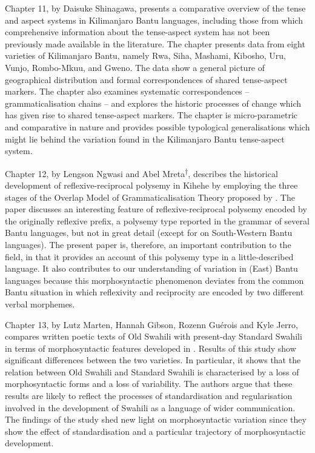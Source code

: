 \documentclass[output=paper]{langscibook}
\begin{document}
Chapter 11, by Daisuke Shinagawa, presents a comparative overview of the tense and aspect systems in Kilimanjaro Bantu languages, including those from which comprehensive information about the tense-aspect system has not been previously made available in the literature. The chapter presents data from eight varieties of Kilimanjaro Bantu, namely Rwa, Siha, Mashami, Kibosho, Uru, Vunjo, Rombo-Mkuu, and Gweno. The data show a general picture of geographical distribution and formal correspondences of shared tense-aspect markers. The chapter also examines systematic correspondences – grammaticalisation chains – and explores the historic processes of change which has given rise to shared tense-aspect markers. The chapter is micro-parametric and comparative in nature and provides possible typological generalisations which might lie behind the variation found in the Kilimanjaro Bantu tense-aspect system.

Chapter 12, by Lengson Ngwasi and Abel Mreta\textsuperscript{†}, describes the historical development of reflexive-reciprocal polysemy in Kihehe by employing the three stages of the Overlap Model of Grammaticalisation Theory proposed by \citet{Heine1993}. The paper discusses an interesting feature of reflexive-reciprocal polysemy encoded by the originally reflexive prefix, a polysemy type reported in the grammar of several Bantu languages, but not in great detail (except for \citealt{BostoenForthcoming} on South-Western Bantu languages). The present paper is, therefore, an important contribution to the field, in that it provides an account of this polysemy type in a little-described language. It also contributes to our understanding of variation in (East) Bantu languages because this morphosyntactic phenomenon deviates from the common Bantu situation in which reflexivity and reciprocity are encoded by two different verbal morphemes.

Chapter 13, by Lutz Marten, Hannah Gibson, Rozenn Guérois and Kyle Jerro, compares written poetic texts of Old Swahili with present-day Standard Swahili in terms of morphosyntactic features developed in \citet{GuéroisEtAl2017}. Results of this study show significant differences between the two varieties. In particular, it shows that the relation between Old Swahili and Standard Swahili is characterised by a loss of morphosyntactic forms and a loss of variability. The authors argue that these results are likely to reflect the processes of standardisation and regularisation involved in the development of Swahili as a language of wider communication. The findings of the study shed new light on morphosyntactic variation since they show the effect of standardisation and a particular trajectory of morphosyntactic development.
\end{document}
